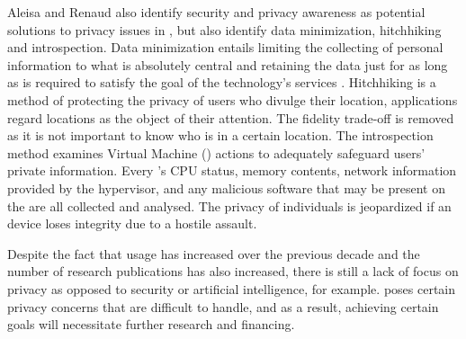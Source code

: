 Aleisa and Renaud \cite{aleisa2016privacy} also identify security and privacy
awareness as potential solutions to privacy issues in \hyperlink{\acronym}{\acronym}, but also identify
data minimization, hitchhiking and introspection. Data minimization entails
limiting the collecting of personal information to what is absolutely central
and retaining the data just for as long as is required to satisfy the goal
of the technology's services \cite{ojDirective281}. Hitchhiking \cite{tang2006putting}
is a method of protecting the privacy of users who divulge their location,
applications regard locations as the object of their attention. The fidelity
trade-off is removed as it is not important to know who is in a certain
location. The introspection \cite{kang2015protection} method examines Virtual
Machine (\hyperlink{\acronym}{\acronym}) actions to adequately safeguard users' private information.
Every \hyperlink{\acronym}{\acronym}'s CPU status, memory contents, network information provided by the
hypervisor, and any malicious software that may be present on the \hyperlink{\acronym}{\acronym} are
all collected and analysed. The privacy of individuals is jeopardized if
an \hyperlink{\acronym}{\acronym} device loses integrity due to a hostile assault.

Despite the fact that \hyperlink{\acronym}{\acronym} usage has increased over the previous decade and
the number of research publications has also increased, there is still a lack
of focus on privacy as opposed to security or artificial intelligence, for
example. \hyperlink{\acronym}{\acronym} poses certain privacy concerns that are difficult to handle, and
as a result, achieving certain goals will necessitate further research and
financing.

